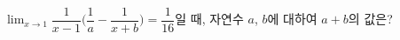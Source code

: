 $\displaystyle\lim_{x\to 1}\dfrac{1}{x-1}\Big(\dfrac{1}{a}-\dfrac{1}{x+b}\Big)=\dfrac{1}{16}$일 때, 자연수 $a$, $b$에 대하여 $a+b$의 값은?
